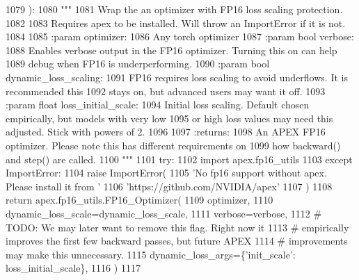 \begin{DoxyCode}
1079 ):
1080     \textcolor{stringliteral}{"""}
1081 \textcolor{stringliteral}{    Wrap the an optimizer with FP16 loss scaling protection.}
1082 \textcolor{stringliteral}{}
1083 \textcolor{stringliteral}{    Requires apex to be installed. Will throw an ImportError if it is not.}
1084 \textcolor{stringliteral}{}
1085 \textcolor{stringliteral}{    :param optimizer:}
1086 \textcolor{stringliteral}{        Any torch optimizer}
1087 \textcolor{stringliteral}{    :param bool verbose:}
1088 \textcolor{stringliteral}{        Enables verbose output in the FP16 optimizer. Turning this on can help}
1089 \textcolor{stringliteral}{        debug when FP16 is underperforming.}
1090 \textcolor{stringliteral}{    :param bool dynamic\_loss\_scaling:}
1091 \textcolor{stringliteral}{        FP16 requires loss scaling to avoid underflows. It is recommended this}
1092 \textcolor{stringliteral}{        stays on, but advanced users may want it off.}
1093 \textcolor{stringliteral}{    :param float loss\_initial\_scale:}
1094 \textcolor{stringliteral}{        Initial loss scaling. Default chosen empirically, but models with very low}
1095 \textcolor{stringliteral}{        or high loss values may need this adjusted. Stick with powers of 2.}
1096 \textcolor{stringliteral}{}
1097 \textcolor{stringliteral}{    :returns:}
1098 \textcolor{stringliteral}{        An APEX FP16 optimizer. Please note this has different requirements on}
1099 \textcolor{stringliteral}{        how backward() and step() are called.}
1100 \textcolor{stringliteral}{    """}
1101     \textcolor{keywordflow}{try}:
1102         \textcolor{keyword}{import} apex.fp16\_utils
1103     \textcolor{keywordflow}{except} ImportError:
1104         \textcolor{keywordflow}{raise} ImportError(
1105             \textcolor{stringliteral}{'No fp16 support without apex. Please install it from '}
1106             \textcolor{stringliteral}{'https://github.com/NVIDIA/apex'}
1107         )
1108     \textcolor{keywordflow}{return} apex.fp16\_utils.FP16\_Optimizer(
1109         optimizer,
1110         dynamic\_loss\_scale=dynamic\_loss\_scale,
1111         verbose=verbose,
1112         \textcolor{comment}{# TODO: We may later want to remove this flag. Right now it}
1113         \textcolor{comment}{# empirically improves the first few backward passes, but future APEX}
1114         \textcolor{comment}{# improvements may make this unnecessary.}
1115         dynamic\_loss\_args=\{\textcolor{stringliteral}{'init\_scale'}: loss\_initial\_scale\},
1116     )
1117 \end{DoxyCode}
\mbox{\label{namespaceparlai_1_1utils_1_1misc_ad935ab0a9d49b897c5e3efdbe1c46c4d}} 

